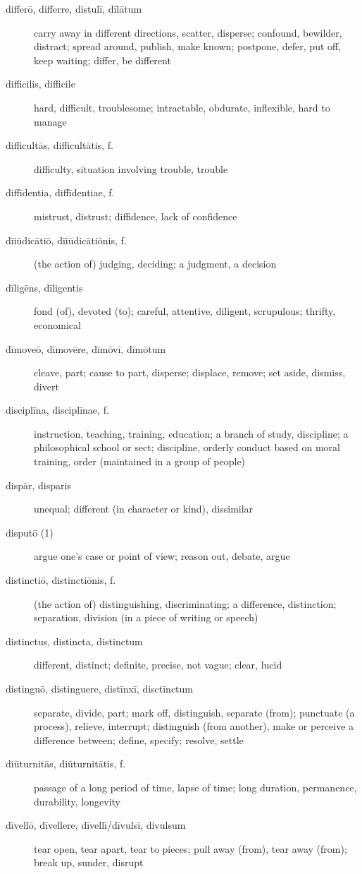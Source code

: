 \begin{description}
    \item[differō, differre, distulī, dīlātum] \marginnote{*}carry away in different directions, scatter, disperse; confound, bewilder, distract; spread around, publish, make known; postpone, defer, put off, keep waiting; differ, be different
    \item[difficilis, difficile] \marginnote{*}hard, difficult, troublesome; intractable, obdurate, inflexible, hard to manage
    \item[difficultās, difficultātis, f.] difficulty, situation involving trouble, trouble
    \item[diffīdentia, diffīdentiae, f.] mistrust, distrust; diffidence, lack of confidence
    \item[dīiūdicātiō, dīiūdicātiōnis, f.] (the action of) judging, deciding; a judgment, a decision
    \item[dīligēns, dīligentis] fond (of), devoted (to); careful, attentive, diligent, scrupulous; thrifty, economical
    \item[dīmoveō, dīmovēre, dīmōvī, dīmōtum] cleave, part; cause to part, disperse; displace, remove; set aside, dismiss, divert
    \item[disciplīna, disciplīnae, f.] instruction, teaching, training, education; a branch of study, discipline; a philosophical school or sect; discipline, orderly conduct based on moral training, order (maintained in a group of people)
    \item[dispār, disparis] unequal; different (in character or kind), dissimilar
    \item[disputō (1)] argue one's case or point of view; reason out, debate, argue
    \item[distinctiō, distinctiōnis, f.] (the action of) distinguishing, discriminating; a difference, distinction; separation, division (in a piece of writing or speech)
    \item[distinctus, distincta, distinctum] \marginnote{*}different, distinct; definite, precise, not vague; clear, lucid
    \item[distinguō, distinguere, distīnxī, disctīnctum] separate, divide, part; mark off, distinguish, separate (from); punctuate (a process), relieve, interrupt; distinguish (from another), make or perceive a difference between; define, specify; resolve, settle
    \item[diūturnitās, diūturnitātis, f.] passage of a long period of time, lapse of time; long duration, permanence, durability, longevity
    \item[dīvellō, dīvellere, dīvellī/dīvulsī, divulsum] tear open, tear apart, tear to pieces; pull away (from), tear away (from); break up, sunder, disrupt

\end{description}
